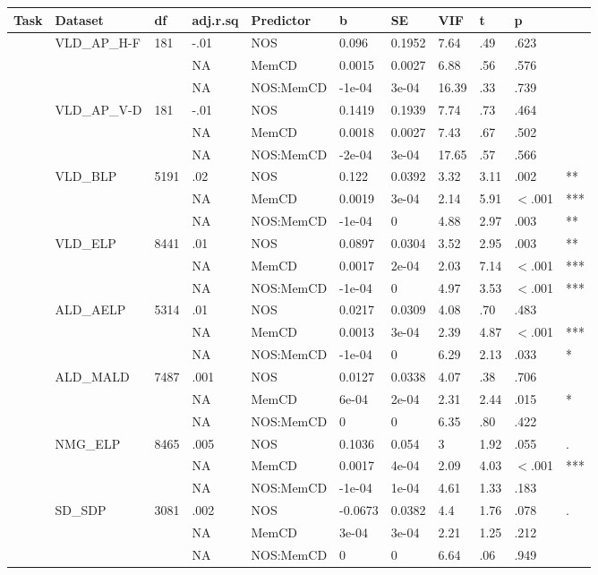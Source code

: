 \begin{table}[ht]
\centering
\begingroup\normalsize
\begin{tabular}{lllllllllll}
  \hline
Task & Dataset & df & adj.r.sq & Predictor & b & SE & VIF & t & p &  \\ 
  \hline
 & VLD\_AP\_H-F & 181 & -.01 & NOS & 0.096 & 0.1952 & 7.64 & .49 & .623 &   \\ 
   &  &  & NA & MemCD & 0.0015 & 0.0027 & 6.88 & .56 & .576 &   \\ 
   &  &  & NA & NOS:MemCD & -1e-04 & 3e-04 & 16.39 & .33 & .739 &   \\ 
   & VLD\_AP\_V-D & 181 & -.01 & NOS & 0.1419 & 0.1939 & 7.74 & .73 & .464 &   \\ 
   &  &  & NA & MemCD & 0.0018 & 0.0027 & 7.43 & .67 & .502 &   \\ 
   &  &  & NA & NOS:MemCD & -2e-04 & 3e-04 & 17.65 & .57 & .566 &   \\ 
   & VLD\_BLP & 5191 & .02 & NOS & 0.122 & 0.0392 & 3.32 & 3.11 & .002 & ** \\ 
   &  &  & NA & MemCD & 0.0019 & 3e-04 & 2.14 & 5.91 & $<$.001 & *** \\ 
   &  &  & NA & NOS:MemCD & -1e-04 & 0 & 4.88 & 2.97 & .003 & ** \\ 
   & VLD\_ELP & 8441 & .01 & NOS & 0.0897 & 0.0304 & 3.52 & 2.95 & .003 & ** \\ 
   &  &  & NA & MemCD & 0.0017 & 2e-04 & 2.03 & 7.14 & $<$.001 & *** \\ 
   &  &  & NA & NOS:MemCD & -1e-04 & 0 & 4.97 & 3.53 & $<$.001 & *** \\ 
   & ALD\_AELP & 5314 & .01 & NOS & 0.0217 & 0.0309 & 4.08 & .70 & .483 &   \\ 
   &  &  & NA & MemCD & 0.0013 & 3e-04 & 2.39 & 4.87 & $<$.001 & *** \\ 
   &  &  & NA & NOS:MemCD & -1e-04 & 0 & 6.29 & 2.13 & .033 & * \\ 
   & ALD\_MALD & 7487 & .001 & NOS & 0.0127 & 0.0338 & 4.07 & .38 & .706 &   \\ 
   &  &  & NA & MemCD & 6e-04 & 2e-04 & 2.31 & 2.44 & .015 & * \\ 
   &  &  & NA & NOS:MemCD & 0 & 0 & 6.35 & .80 & .422 &   \\ 
   & NMG\_ELP & 8465 & .005 & NOS & 0.1036 & 0.054 & 3 & 1.92 & .055 & . \\ 
   &  &  & NA & MemCD & 0.0017 & 4e-04 & 2.09 & 4.03 & $<$.001 & *** \\ 
   &  &  & NA & NOS:MemCD & -1e-04 & 1e-04 & 4.61 & 1.33 & .183 &   \\ 
   & SD\_SDP & 3081 & .002 & NOS & -0.0673 & 0.0382 & 4.4 & 1.76 & .078 & . \\ 
   &  &  & NA & MemCD & 3e-04 & 3e-04 & 2.21 & 1.25 & .212 &   \\ 
   &  &  & NA & NOS:MemCD & 0 & 0 & 6.64 & .06 & .949 &   \\ 
   \hline
\end{tabular}
\endgroup
\end{table}
